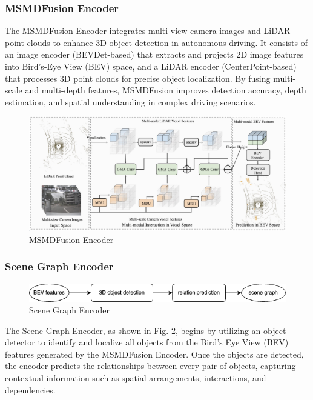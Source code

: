 \documentclass{article} %
\begin{document}
	\subsubsection{MSMDFusion Encoder}
	The MSMDFusion Encoder integrates multi-view camera images and LiDAR point clouds to enhance 3D object detection in autonomous driving. It consists of an image encoder (BEVDet-based) that extracts and projects 2D image features into Bird’s-Eye View (BEV) space, and a LiDAR encoder (CenterPoint-based) that processes 3D point clouds for precise object localization. By fusing multi-scale and multi-depth features, MSMDFusion improves detection accuracy, depth estimation, and spatial understanding in complex driving scenarios.
	
	\begin{figure}[H]
		\centering
		\includegraphics[width=0.75\linewidth]{Figures/msmdfusion.jpg}
		\caption{MSMDFusion Encoder}
		\label{fig:ekg}
	\end{figure}
	
	\subsubsection{Scene Graph Encoder}
	
	\begin{figure}[H]
		\centering
		\includegraphics[width=0.8\linewidth]{Figures/scene-graph.png}
		\caption{Scene Graph Encoder}
		\label{fig:scene-graph}
	\end{figure}
	
	The Scene Graph Encoder, as shown in Fig. \ref{fig:scene-graph}, begins by utilizing an object detector to identify and localize all objects from the Bird's Eye View (BEV) features generated by the MSMDFusion Encoder. Once the objects are detected, the encoder predicts the relationships between every pair of objects, capturing contextual information such as spatial arrangements, interactions, and dependencies. 
	
\end{document}
